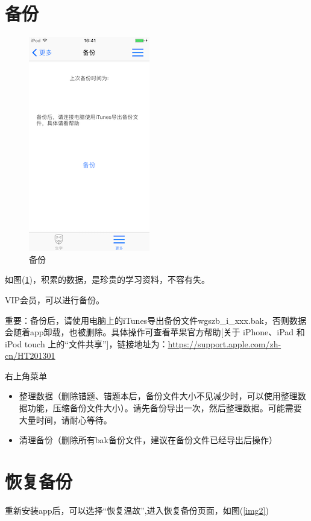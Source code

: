 \section{备份}
\begin{figure}[H]
	\centering
	\includegraphics{img/13.png}
	\caption{备份}
	\label{img13}
\end{figure}
如图(\ref{img13})，积累的数据，是珍贵的学习资料，不容有失。

VIP会员，可以进行备份。

重要：备份后，请使用电脑上的iTunes导出备份文件wgszb\_i\_xxx.bak，否则数据会随着app卸载，也被删除。具体操作可查看苹果官方帮助[关于 iPhone、iPad 和 iPod touch 上的“文件共享”]，链接地址为：\url{https://support.apple.com/zh-cn/HT201301}

右上角菜单
\begin{itemize}
	\item 整理数据（删除错题、错题本后，备份文件大小不见减少时，可以使用整理数据功能，压缩备份文件大小）。请先备份导出一次，然后整理数据。可能需要大量时间，请耐心等待。
	\item 清理备份（删除所有bak备份文件，建议在备份文件已经导出后操作）
\end{itemize}

\section{恢复备份}
\label{restore}
重新安装app后，可以选择“恢复温故”,进入恢复备份页面，如图(\ref{img2})

